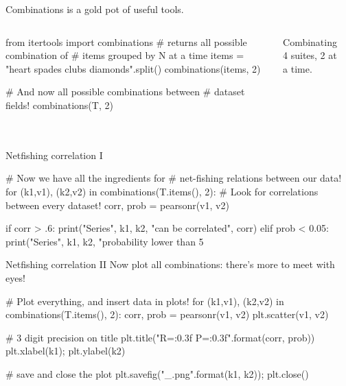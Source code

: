 \documentclass{beamer}[10]
\begin{document}
\begin{pyframe}{Combinations}
 is a gold pot of useful tools.

\begin{columns}
\begin{pycode}
from itertools import combinations
# returns all possible combination of
#  items grouped by N at a time
items = "heart spades clubs diamonds".split()
combinations(items, 2)

# And now all possible combinations between
#  dataset fields!
combinations(T, 2)
\end{pycode}
Combinating 4 suites, 2 at a time.\\
\begin{center}
\\
\hearts \spades \\
\hearts \clubs \\
\hearts \diamonds \\
\spades \clubs \\
\spades \diamonds \\
\clubs \diamonds \\
\end{center}
\end{columns}
\end{pyframe}



\begin{pyframe}{Netfishing correlation I}
\begin{pycode}
# Now we have all the ingredients for
#  net-fishing relations between our data!
for (k1,v1), (k2,v2) in combinations(T.items(), 2):
  # Look for correlations between every dataset!
  corr, prob = pearsonr(v1, v2)
  
  if corr > .6:
    print("Series", k1, k2, "can be correlated", corr)
  elif prob < 0.05:
    print("Series", k1, k2, "probability lower than 5%
   
\end{pycode}
\end{pyframe}


\begin{pyframe}{Netfishing correlation II}
Now plot all combinations: there's more to meet with eyes!
\begin{pycode}
# Plot everything, and insert data in plots!
for (k1,v1), (k2,v2) in combinations(T.items(), 2):
    corr, prob = pearsonr(v1, v2)
    plt.scatter(v1, v2)

    # 3 digit precision on title
    plt.title("R={:0.3f} P={:0.3f}".format(corr, prob))
    plt.xlabel(k1); plt.ylabel(k2)

    # save and close the plot
    plt.savefig("{}_{}.png".format(k1, k2)); plt.close()   
\end{pycode}
\end{pyframe}
\end{document}
